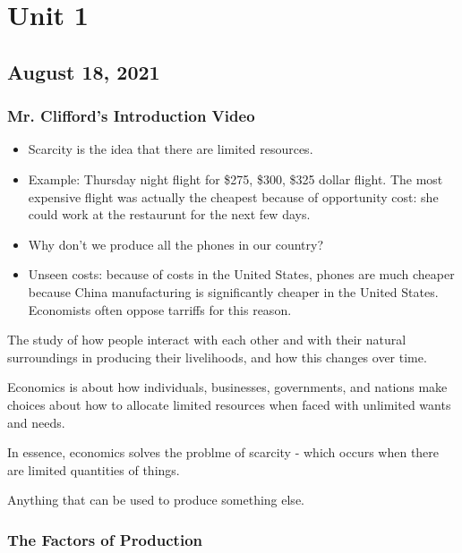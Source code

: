 \documentclass{scrreprt} %
\begin{document}
\section{Unit 1}

\subsection{August 18, 2021}

\subsubsection{Mr. Clifford's Introduction Video}

\begin{itemize}
	\item Scarcity is the idea that there are limited resources.
	\item Example: Thursday night flight for \$275, \$300, \$325 dollar
	flight. The most expensive flight was actually the cheapest because of
	opportunity cost: she could work at the restaurunt for the next few days.
	\item Why don't we produce all the phones in our country?
	\item Unseen costs: because of costs in the United States, phones are
	much cheaper because China manufacturing is significantly cheaper in the
	United States. Economists often oppose tarriffs for this reason.
\end{itemize}

\begin{definition}[Economics 1]
	The study of how people interact with each other and with their natural
	surroundings in producing their livelihoods, and how this changes over time.
\end{definition}

\begin{definition}[Economics 2]
	Economics is about how individuals, businesses, governments, and nations
	make choices about how to allocate limited resources when faced with
	unlimited wants and needs.
\end{definition}

In essence, economics solves the problme of scarcity - which occurs when there
are limited quantities of things.

\begin{definition}[Resources]
	Anything that can be used to produce something else.
\end{definition}

\subsubsection{The Factors of Production}
\end{document}
